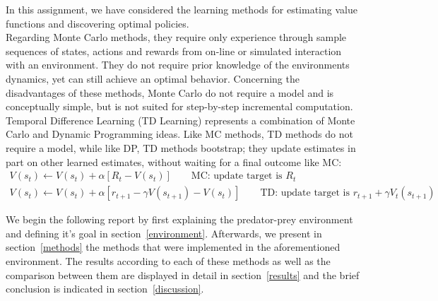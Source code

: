 \documentclass[paper=a4, fontsize=11pt]{scrartcl}
\numberwithin{equation}{section}		%
\numberwithin{figure}{section}			%
\numberwithin{table}{section}				%
\begin{document}




In this assignment, we have considered the learning methods for estimating value functions and discovering  optimal policies.\\ 
Regarding Monte Carlo methods, they require only experience through sample sequences of states, actions and rewards from on-line or simulated interaction with an environment. They do not require prior knowledge of the environments dynamics, yet can still achieve an optimal behavior. Concerning the disadvantages of these methods, Monte Carlo do not require a model and is conceptually simple, but is not suited for step-by-step incremental  computation.\\
Temporal Difference Learning (TD Learning) represents a combination of Monte Carlo and Dynamic Programming ideas. Like MC methods, TD methods do not require a model, while like DP, TD methods bootstrap; they update estimates in part on other learned estimates, without waiting for a final outcome like MC:\\
\begin{align}
V(s_t) \leftarrow V(s_t) + \alpha [R_t-V(s_t)] \qquad \text{MC: update target is $R_t$} \\
V(s_t) \leftarrow V(s_t) + \alpha[r_{t+1}-\gamma V(s_{t+1})-V(s_t)] \qquad \text{TD: update target is $r_{t+1}+\gamma V_t(s_{t+1})$}
\end{align}
 
We begin the following report by first explaining the predator-prey environment and defining it's goal in section~\ref{environment}. Afterwards, we present in section~\ref{methods} the methods that were implemented in the aforementioned environment. The results according to each of these methods as well as the comparison between them are displayed in detail in section~\ref{results} and the brief conclusion is indicated in section~\ref{discussion}.
\end{document}
